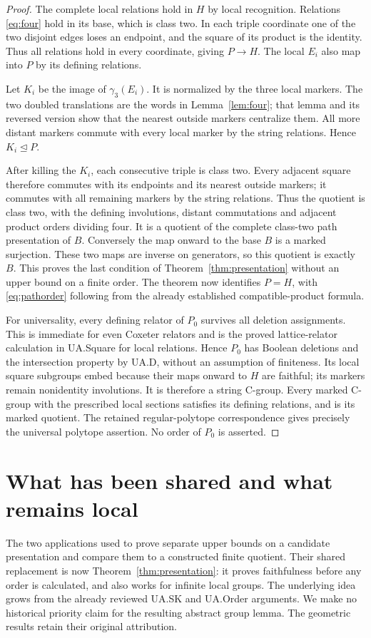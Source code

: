 \documentclass[11pt,a4paper]{article}
\theoremstyle{remark}\newtheorem{remark}[theorem]{Remark}
\begin{document}
\begin{proof}
The complete local relations hold in $H$ by local recognition. Relations
\eqref{eq:four} hold in its base, which is class two. In each triple coordinate
one of the two disjoint edges loses an endpoint, and the square of its product
is the identity. Thus all relations hold in every coordinate, giving $P\to H$.
The local $E_i$ also map into $P$ by its defining relations.

Let $K_i$ be the image of $\gamma_3(E_i)$. It is normalized by the three
local markers. The two doubled translations are the words in
Lemma~\ref{lem:four}; that lemma and its reversed version show that the
nearest outside markers centralize them. All more distant markers commute
with every local marker by the string relations. Hence $K_i\unlhd P$.

After killing the $K_i$, each consecutive triple is class two. Every adjacent
square therefore commutes with its endpoints and its nearest outside markers;
it commutes with all remaining markers by the string relations. Thus the
quotient is class two, with the defining involutions, distant commutations and
adjacent product orders dividing four. It is a quotient of the complete
class-two path presentation of $B$. Conversely the map onward to the base
$B$ is a marked surjection. These two maps are inverse on generators, so this
quotient is exactly $B$. This proves the last condition of
Theorem~\ref{thm:presentation} without an upper bound on a finite order.
The theorem now identifies $P=H$, with \eqref{eq:pathorder} following from
the already established compatible-product formula.

For universality, every defining relator of $P_0$ survives all deletion
assignments. This is immediate for even Coxeter relators and is the proved
lattice-relator calculation in UA.Square for local relations. Hence $P_0$
has Boolean deletions and the intersection property by UA.D, without an
assumption of finiteness. Its local square subgroups embed because their maps
onward to $H$ are faithful; its markers remain nonidentity involutions.
It is therefore a string C-group. Every marked C-group with the prescribed
local sections satisfies its defining relations, and is its marked quotient.
The retained regular-polytope correspondence gives precisely the universal
polytope assertion. No order of $P_0$ is asserted.
\end{proof}

\section{What has been shared and what remains local}
The two applications used to prove separate upper bounds on a candidate
presentation and compare them to a constructed finite quotient. Their shared
replacement is now Theorem~\ref{thm:presentation}: it proves faithfulness
before any order is calculated, and also works for infinite local groups.
The underlying idea grows from the already reviewed UA.SK and UA.Order
arguments. We make no historical priority claim for the resulting abstract
group lemma. The geometric results retain their original attribution.
\end{document}
